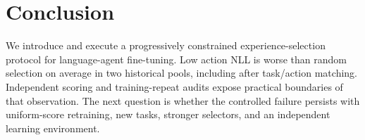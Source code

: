 \section{Conclusion}
We introduce and execute a progressively constrained experience-selection protocol for language-agent fine-tuning. Low action NLL is worse than random selection on average in two historical pools, including after task/action matching. Independent scoring and training-repeat audits expose practical boundaries of that observation. The next question is whether the controlled failure persists with uniform-score retraining, new tasks, stronger selectors, and an independent learning environment.
